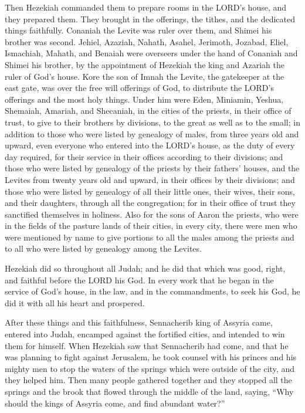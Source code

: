 \myverse{}Then Hezekiah commanded them to prepare rooms in the LORD’s
house, and they prepared them.
\myverse{}They brought in the offerings, the tithes, and the dedicated things faithfully.
Conaniah the Levite was ruler over them, and Shimei his brother was second.
\myverse{}Jehiel, Azaziah, Nahath, Asahel, Jerimoth, Jozabad, Eliel, Ismachiah, Mahath,
and Benaiah were overseers under the hand of Conaniah and Shimei his brother, by the appointment of Hezekiah
the king and Azariah the ruler of God’s house.
\myverse{}Kore the son of Imnah the Levite, the gatekeeper at the east gate, was over
the free will offerings of God, to distribute the LORD’s offerings and the most holy things.
\myverse{}Under him were Eden, Miniamin, Yeshua, Shemaiah, Amariah, and Shecaniah,
in the cities of the priests, in their office of trust, to give to their brothers by divisions, to the
great as well as to the small;
\myverse{}in addition to those who were listed by genealogy of males, from three years
old and upward, even everyone who entered into the LORD’s house, as the duty of every day required, for
their service in their offices according to their divisions;
\myverse{}and those who were listed by genealogy of the priests by their fathers’ houses,
and the Levites from twenty years old and upward, in their offices by their divisions;
\myverse{}and those who were listed by genealogy of all their little ones, their wives,
their sons, and their daughters, through all the congregation; for in their office of trust they sanctified
themselves in holiness.
\myverse{}Also for the sons of Aaron the priests, who were in the fields of the pasture
lands of their cities, in every city, there were men who were mentioned by name to give portions to all
the males among the priests and to all who were listed by genealogy among the Levites.

\myverse{}Hezekiah did so throughout all Judah; and he did that which
was good, right, and faithful before the LORD his God.
\myverse{}In every work that he began in the service of God’s house, in the law, and
in the commandments, to seek his God, he did it with all his heart and prospered.


\mychapter{} \myverse*{}After these things and this faithfulness, Sennacherib king of
Assyria came, entered into Judah, encamped against the fortified cities, and intended to win them for
himself.
\myverse{}When Hezekiah saw that Sennacherib had come, and that he was planning to fight
against Jerusalem,
\myverse{}he took counsel with his princes and his mighty men to stop the waters of the
springs which were outside of the city, and they helped him.
\myverse{}Then many people gathered together and they stopped all the springs and the
brook that flowed through the middle of the land, saying, “Why should the kings of Assyria come, and find
abundant water?”

